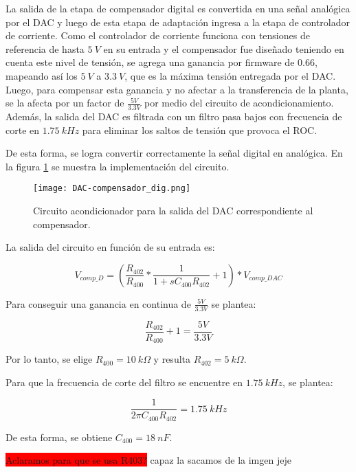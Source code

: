 La salida de la etapa de compensador digital es convertida en una señal analógica por el DAC y luego de esta etapa de adaptación ingresa a la etapa de controlador de corriente. Como el controlador de corriente funciona con tensiones de referencia de hasta $5\:V$ en su entrada y el compensador fue diseñado teniendo en cuenta este nivel de tensión, se agrega una ganancia por firmware de $0.66$, mapeando así los $5\:V$ a $3.3\:V$, que es la máxima tensión entregada por el DAC. Luego, para compensar esta ganancia y no afectar a la transferencia de la planta, se la afecta por un factor de $\frac{5V}{3.3V}$ por medio del circuito de acondicionamiento. Además, la salida del DAC es filtrada con un filtro pasa bajos con frecuencia de corte en $1.75\:kHz$ para eliminar los saltos de tensión que provoca el ROC.

De esta forma, se logra convertir correctamente la señal digital en analógica. En la figura \ref{fig:DAC-compensador} se muestra la implementación del circuito.

\begin{figure}[H]
	\centering
	\texttt{[image: DAC-compensador\_dig.png]}
	\caption{Circuito acondicionador para la salida del DAC correspondiente al compensador.}
	\label{fig:DAC-compensador}
\end{figure}

La salida del circuito en función de su entrada es:

\begin{equation*} 
	V_{comp\_D}=(\frac{R_{402}}{R_{400}} *\frac{1}{1+sC_{400}R_{402}}+1)*V_{comp\_DAC}
\end{equation*}

Para conseguir una ganancia en continua de  $\frac{5V}{3.3V}$ se plantea:

\begin{equation*} 
	\frac{R_{402}}{R_{400}} +1 = \frac{5V}{3.3V}
\end{equation*}

Por lo tanto, se elige $R_{400}=10\:k\Omega$ y resulta $R_{402}=5\:k\Omega$. 

Para que la frecuencia de corte del filtro se encuentre en $1.75\:kHz$, se plantea:

\begin{equation*} 
	\frac{1}{2\pi C_{400}R_{402}}=1.75\:kHz
\end{equation*}

De esta forma, se obtiene $C_{400}=18\:nF$. 

\colorbox{red}{Aclaramos para que se usa R403?} capaz la sacamos de la imgen jeje	


